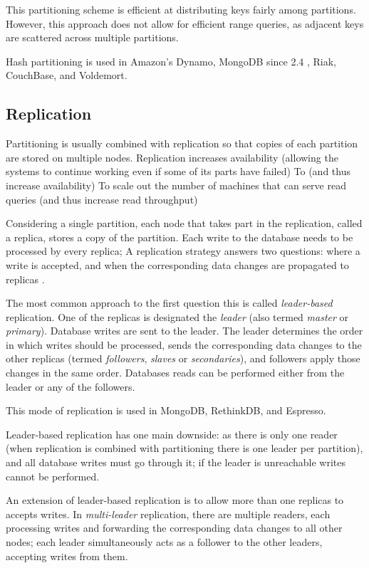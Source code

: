 This partitioning scheme is efficient at distributing keys fairly among partitions.
However, this approach does not allow for efficient range queries, as adjacent keys are scattered across multiple
partitions.

Hash partitioning is used in Amazon's Dynamo, MongoDB since 2.4 \cite{mongo:hashpartitioning}, Riak, CouchBase,
and Voldemort.

\subsection{Replication}
\label{sec:replication}

Partitioning is usually combined with replication so that copies of each partition are stored on multiple nodes.
Replication increases availability (allowing the systems to continue working even if some of its parts have failed)
To  (and thus increase availability)
To scale out the number of machines that can serve read queries (and thus increase read throughput)

Considering a single partition, each node that takes part in the replication, called a replica, stores a copy of the
partition.
Each write to the database needs to be processed by every replica;
A replication strategy answers two questions: where a write is accepted, and when the corresponding data changes are
propagated to replicas \cite{gray:replication}.

\bigskip
\noindent
The most common approach to the first question this is called \textit{leader-based} replication.
One of the replicas is designated the \textit{leader} (also termed \textit{master} or \textit{primary}).
Database writes are sent to the leader.
The leader determines the order in which writes should be processed, sends the corresponding data changes to the other
replicas (termed \textit{followers}, \textit{slaves} or \textit{secondaries}),
and followers apply those changes in the same order.
Databases reads can be performed either from the leader or any of the followers.

This mode of replication is used in MongoDB, RethinkDB, and Espresso.

Leader-based replication has one main downside: as there is only one reader (when replication is combined with partitioning there is one leader per partition),
and all database writes must go through it; if the leader is unreachable writes cannot be performed.

An extension of leader-based replication is to allow more than one replicas to accepts writes.
In \textit{multi-leader} replication, there are multiple readers, each processing writes and forwarding the corresponding data changes to all other nodes;
each leader simultaneously acts as a follower to the other leaders, accepting writes from them.


